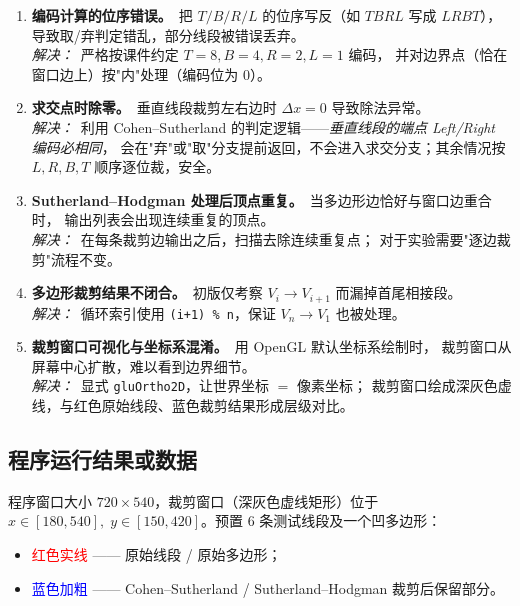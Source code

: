 \documentclass[a4paper,12pt]{ctexart}
\begin{document}
\begin{enumerate}[leftmargin=2em,itemsep=0.4em]
    \item \textbf{编码计算的位序错误。}\ 把 $T/B/R/L$ 的位序写反（如 $TBRL$ 写成 $LRBT$），
        导致取/弃判定错乱，部分线段被错误丢弃。\\
        \textit{解决：}\ 严格按课件约定 $T=8,B=4,R=2,L=1$ 编码，
        并对边界点（恰在窗口边上）按"内"处理（编码位为 $0$）。

    \item \textbf{求交点时除零。}\ 垂直线段裁剪左右边时 $\Delta x=0$ 导致除法异常。\\
        \textit{解决：}\ 利用 Cohen–Sutherland 的判定逻辑——\emph{垂直线段的端点 Left/Right 编码必相同}，
        会在"弃"或"取"分支提前返回，不会进入求交分支；其余情况按 $L,R,B,T$ 顺序逐位裁，安全。

    \item \textbf{Sutherland–Hodgman 处理后顶点重复。}\ 当多边形边恰好与窗口边重合时，
        输出列表会出现连续重复的顶点。\\
        \textit{解决：}\ 在每条裁剪边输出之后，扫描去除连续重复点；
        对于实验需要"逐边裁剪"流程不变。

    \item \textbf{多边形裁剪结果不闭合。}\ 初版仅考察 $V_i \to V_{i+1}$ 而漏掉首尾相接段。\\
        \textit{解决：}\ 循环索引使用 \texttt{(i+1) \% n}，保证 $V_n\to V_1$ 也被处理。

    \item \textbf{裁剪窗口可视化与坐标系混淆。}\ 用 OpenGL 默认坐标系绘制时，
        裁剪窗口从屏幕中心扩散，难以看到边界细节。\\
        \textit{解决：}\ 显式 \texttt{gluOrtho2D}，让世界坐标 $=$ 像素坐标；
        裁剪窗口绘成深灰色虚线，与红色原始线段、蓝色裁剪结果形成层级对比。
\end{enumerate}

\subsection{程序运行结果或数据}

程序窗口大小 $720\times 540$，裁剪窗口（深灰色虚线矩形）位于
$x\in[180,540],\;y\in[150,420]$。预置 $6$ 条测试线段及一个凹多边形：

\begin{itemize}[leftmargin=2em,itemsep=0.2em]
    \item \textcolor{red}{红色实线} —— 原始线段 / 原始多边形；
    \item \textcolor{blue}{蓝色加粗} —— Cohen–Sutherland / Sutherland–Hodgman 裁剪后保留部分。
\end{itemize}
\end{document}
